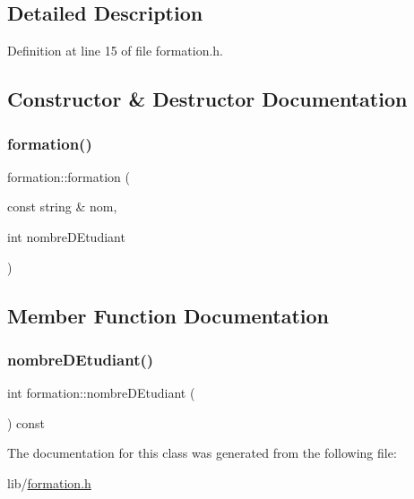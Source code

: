\subsection{Detailed Description}


Definition at line 15 of file formation.\+h.



\subsection{Constructor \& Destructor Documentation}
\hypertarget{classformation_af34ced9e0539ebc32d9f87a79e3b383a}{}\label{classformation_af34ced9e0539ebc32d9f87a79e3b383a} 
\subsubsection{\texorpdfstring{formation()}{formation()}}
{\footnotesize\ttfamily formation\+::formation (\begin{DoxyParamCaption}\item[{const string \&}]{nom,  }\item[{int}]{nombre\+D\+Etudiant }\end{DoxyParamCaption})}



\subsection{Member Function Documentation}
\hypertarget{classformation_ad2cf7556c2c72212e1305a287ce25580}{}\label{classformation_ad2cf7556c2c72212e1305a287ce25580} 
\subsubsection{\texorpdfstring{nombre\+D\+Etudiant()}{nombreDEtudiant()}}
{\footnotesize\ttfamily int formation\+::nombre\+D\+Etudiant (\begin{DoxyParamCaption}{ }\end{DoxyParamCaption}) const}



The documentation for this class was generated from the following file\+:\begin{DoxyCompactItemize}
\item 
lib/\hyperlink{formation_8h}{formation.\+h}\end{DoxyCompactItemize}

